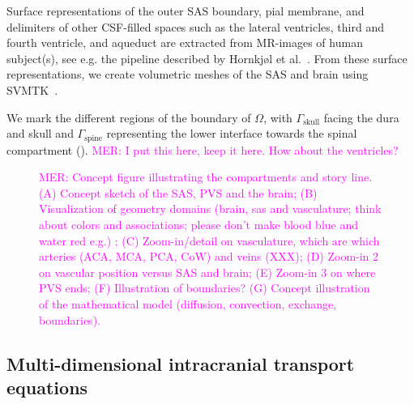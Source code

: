 \documentclass[fleqn,10pt]{wlscirep}
\newcommand{\mer}[1]{\textcolor{magenta}{#1}}
\begin{document}
Surface representations of the outer SAS boundary, pial membrane, and delimiters of other CSF-filled spaces such as the lateral ventricles, third and fourth ventricle, and aqueduct are extracted from MR-images of human subject(s), see e.g. the pipeline described by Hornkjøl et al.~\cite{hornkjol2022csf}. From these surface representations, we create volumetric meshes of the SAS and brain using SVMTK~\cite{mardal2022mathematical}. 

We mark the different regions of the boundary of $\Omega$, with
$\Gamma_{\mathrm{skull}}$ facing the dura and skull and
$\Gamma_{\mathrm{spine}}$ representing the lower interface towards the
spinal compartment (). \mer{MER: I put this here, keep
  it here. How about the ventricles?}

\begin{figure}
  \caption{\mer{MER: Concept figure illustrating the compartments and story line. (A) Concept sketch of the SAS, PVS and the brain; (B) Visualization of geometry domains (brain, sas and vasculature; think about colors and associations; please don't make blood blue and water red e.g.) ; (C) Zoom-in/detail on vasculature, which are which arteries (ACA, MCA, PCA, CoW)  and veins (XXX); (D) Zoom-in 2 on vascular position versus SAS and brain; (E) Zoom-in 3 on where PVS ends; (F) Illustration of boundaries? (G) Concept illustration of the mathematical model (diffusion, convection, exchange, boundaries).}}
\label{fig:concept}
\end{figure}

\subsection*{Multi-dimensional intracranial transport equations}
\end{document}
